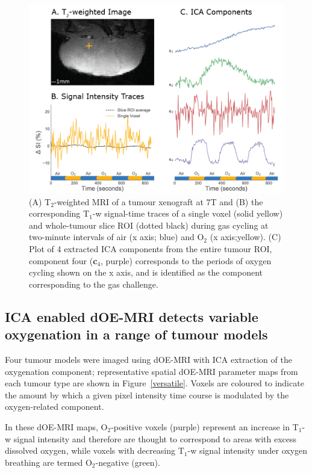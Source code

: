 \begin{figure}[htbp]
   \centering
   \includegraphics[width=\textwidth]{oemri/oemri-images/oemri_technique.png} %
   \caption{(A) T$_2$-weighted MRI of a tumour xenograft at 7T and (B) the corresponding T$_1$-w signal-time traces of a single voxel (solid yellow) and whole-tumour slice ROI (dotted black) during gas cycling at two-minute intervals of air (x axis; blue) and O$_2$ (x axis;yellow).
(C) Plot of 4 extracted ICA components from the entire tumour ROI, component four (\textbf{c$_4$}, purple) corresponds to the periods of oxygen cycling shown on the x axis, and is identified as the component corresponding to the gas challenge.}
   \label{technique}
\end{figure}

\subsection{ICA enabled dOE-MRI detects variable oxygenation in a range of tumour models}

Four tumour models were imaged using dOE-MRI with ICA extraction of the oxygenation component; representative spatial dOE-MRI parameter maps from each tumour type are shown in Figure~\ref{versatile}.
Voxels are coloured to indicate the amount by which a given pixel intensity time course is modulated by the oxygen-related component.

In these dOE-MRI maps, O$_2$-positive voxels (purple) represent an increase in T$_1$-w signal intensity and therefore are thought to correspond to areas with excess dissolved oxygen, while voxels with decreasing T$_1$-w signal intensity under oxygen breathing are termed O$_2$-negative (green).


